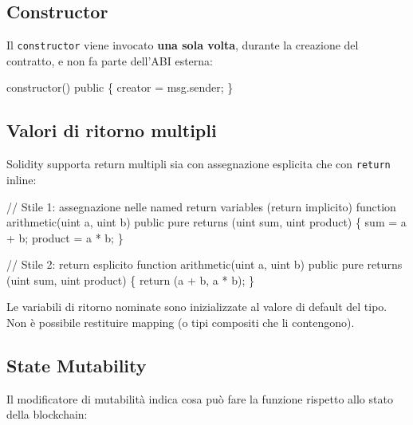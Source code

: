 \documentclass[
  italian,
  openany]{book}
\newenvironment{Shaded}{\begin{snugshade}}{\end{snugshade}}
\newcommand{\NormalTok}[1]{#1}
\begin{document}
\subsection{Constructor}\label{constructor}

Il \texttt{constructor} viene invocato \textbf{una sola volta}, durante
la creazione del contratto, e non fa parte dell'ABI esterna:

\begin{Shaded}
\begin{Highlighting}[]
\NormalTok{constructor() public \{}
\NormalTok{    creator = msg.sender;}
\NormalTok{\}}
\end{Highlighting}
\end{Shaded}

\subsection{Valori di ritorno
multipli}\label{valori-di-ritorno-multipli}

Solidity supporta return multipli sia con assegnazione esplicita che con
\texttt{return} inline:

\begin{Shaded}
\begin{Highlighting}[]
\NormalTok{// Stile 1: assegnazione nelle named return variables (return implicito)}
\NormalTok{function arithmetic(uint a, uint b) public pure}
\NormalTok{    returns (uint sum, uint product)}
\NormalTok{\{}
\NormalTok{    sum = a + b;}
\NormalTok{    product = a * b;}
\NormalTok{\}}

\NormalTok{// Stile 2: return esplicito}
\NormalTok{function arithmetic(uint a, uint b) public pure}
\NormalTok{    returns (uint sum, uint product)}
\NormalTok{\{}
\NormalTok{    return (a + b, a * b);}
\NormalTok{\}}
\end{Highlighting}
\end{Shaded}

Le variabili di ritorno nominate sono inizializzate al valore di default
del tipo. Non è possibile restituire mapping (o tipi compositi che li
contengono).

\subsection{State Mutability}\label{state-mutability}

Il modificatore di mutabilità indica cosa può fare la funzione rispetto
allo stato della blockchain:
\end{document}
